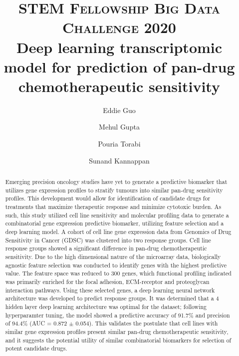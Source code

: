 \documentclass[10pt, letterpaper]{article}
\title{
    \usefont{OT1}{bch}{b}{n}
    \normalfont \normalsize \textsc{STEM Fellowship Big Data Challenge 2020} \\ [10pt]
    \huge Deep learning transcriptomic model for prediction of pan-drug chemotherapeutic sensitivity \\
}
\author[1]{Eddie Guo}
\author[2]{Mehul Gupta}
\author[1]{Pouria Torabi}
\author[2]{Sunand Kannappan}
\affil[1]{University of Alberta}
\affil[2]{University of Calgary}
\begin{document}
\maketitle


\begin{abstract}
	Emerging precision oncology studies have yet to generate a predictive biomarker that utilizes gene expression profiles to stratify tumours into similar pan-drug sensitivity profiles. This development would allow for identification of candidate drugs for treatments that maximize therapeutic response and minimize cytotoxic burden. As such, this study utilized cell line sensitivity and molecular profiling data to generate a combinatorial gene expression predictive biomarker, utilizing feature selection and a deep learning model. A cohort of cell line gene expression data from Genomics of Drug Sensitivity in Cancer (GDSC) was clustered into two response groups. Cell line response groups showed a significant difference in pan-drug chemotherapeutic sensitivity. Due to the high dimensional nature of the microarray data, biologically agnostic feature selection was conducted to identify genes with the highest predictive value. The feature space was reduced to 300 genes, which functional profiling indicated was primarily enriched for the focal adhesion, ECM-receptor and proteoglycan interaction pathways. Using these selected genes, a deep learning neural network architecture was developed to predict response groups. It was determined that a 4 hidden layer deep learning architecture was optimal for the dataset; following hyperparamter tuning, the model showed a predictive accuracy of 91.7\% and precision of 94.4\% (AUC = 0.872 $\pm$ 0.054).  This validates the postulate that cell lines with similar gene expression profiles present similar pan-drug chemotherapeutic sensitivity, and it suggests the potential utility of similar combinatorial biomarkers for selection of potent candidate drugs. \vspace{1em}

\end{abstract} \vspace{1em}
\end{document}
